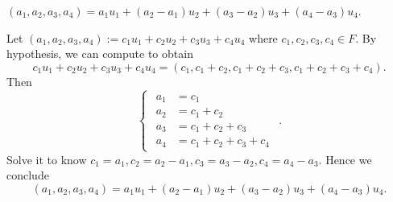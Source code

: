\begin{Exercise}
	\begin{answer}
		$(a_1,a_2,a_3,a_4)=a_1 u_1 + (a_2-a_1) u_2 + (a_3-a_2) u_3 + (a_4-a_3) u_4$.
	\end{answer}
	\begin{solution}
		Let $(a_1,a_2,a_3,a_4) := c_1 u_1 + c_2 u_2 + c_3 u_3 + c_4 u_4$ where $c_1, c_2, c_3, c_4\in F$. By hypothesis, we can compute to obtain
		$$
		c_1 u_1 + c_2 u_2 + c_3 u_3 + c_4 u_4 = (c_1, c_1+c_2, c_1+c_2+c_3,c_1+c_2+c_3+c_4).
		$$
		Then
		$$
		\begin{cases}
		\begin{aligned}
		a_1 &= c_1 \\
		a_2 &= c_1+c_2 \\
		a_3 &= c_1+c_2+c_3 \\
		a_4 &= c_1+c_2+c_3+c_4
		\end{aligned}
		\end{cases}.
		$$
		Solve it to know $c_1 = a_1, c_2 = a_2-a_1, c_3 = a_3-a_2, c_4 = a_4-a_3$. Hence we conclude 
		$$
		(a_1,a_2,a_3,a_4)=a_1 u_1 + (a_2-a_1) u_2 + (a_3-a_2) u_3 + (a_4-a_3) u_4.
		$$
	\end{solution}
\end{Exercise}